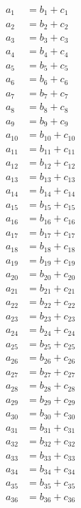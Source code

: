 \begin{align}
  a_{1} &= b_{1} + c_{1}\label{eq:first-row} \\
  a_{2} &= b_{2} + c_{2} \\
  a_{3} &= b_{3} + c_{3} \\
  a_{4} &= b_{4} + c_{4} \\
  a_{5} &= b_{5} + c_{5} \\
  a_{6} &= b_{6} + c_{6} \\
  a_{7} &= b_{7} + c_{7} \\
  a_{8} &= b_{8} + c_{8} \\
  a_{9} &= b_{9} + c_{9} \\
  a_{10} &= b_{10} + c_{10} \\
  a_{11} &= b_{11} + c_{11} \\
  a_{12} &= b_{12} + c_{12} \\
  a_{13} &= b_{13} + c_{13} \\
  a_{14} &= b_{14} + c_{14} \\
  a_{15} &= b_{15} + c_{15} \\
  a_{16} &= b_{16} + c_{16} \\
  a_{17} &= b_{17} + c_{17} \\
  a_{18} &= b_{18} + c_{18} \\
  a_{19} &= b_{19} + c_{19} \\
  a_{20} &= b_{20} + c_{20} \\
  a_{21} &= b_{21} + c_{21} \\
  a_{22} &= b_{22} + c_{22} \\
  a_{23} &= b_{23} + c_{23} \\
  a_{24} &= b_{24} + c_{24} \\
  a_{25} &= b_{25} + c_{25} \\
  a_{26} &= b_{26} + c_{26} \\
  a_{27} &= b_{27} + c_{27} \\
  a_{28} &= b_{28} + c_{28} \\
  a_{29} &= b_{29} + c_{29} \\
  a_{30} &= b_{30} + c_{30} \\
  a_{31} &= b_{31} + c_{31} \\
  a_{32} &= b_{32} + c_{32} \\
  a_{33} &= b_{33} + c_{33} \\
  a_{34} &= b_{34} + c_{34} \\
  a_{35} &= b_{35} + c_{35} \\
  a_{36} &= b_{36} + c_{36} \\

\end{align}
